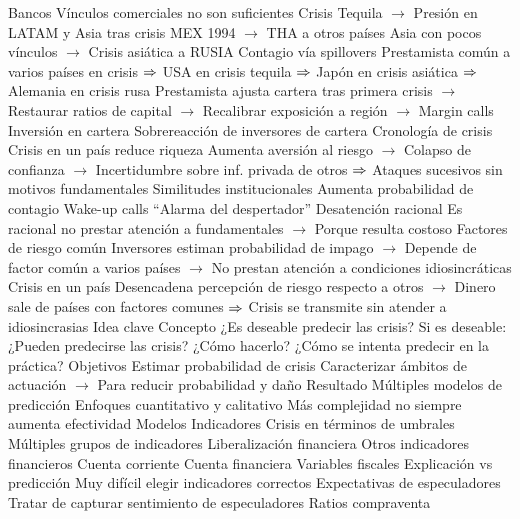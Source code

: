 \documentclass{nuevotema}
\begin{document}
\begin{esquemal}
			\3 Bancos
				\4 Vínculos comerciales no son suficientes
				\4[] Crisis Tequila
				\4[] $\to$ Presión en LATAM y Asia tras crisis MEX 1994
				\4[] $\to$ THA a otros países Asia con pocos vínculos
				\4[] $\to$ Crisis asiática a RUSIA
				\4 Contagio vía spillovers
				\4[] Prestamista común a varios países en crisis
				\4[] $\Rightarrow$ USA en crisis tequila
				\4[] $\Rightarrow$ Japón en crisis asiática
				\4[] $\Rightarrow$ Alemania en crisis rusa
				\4[] Prestamista ajusta cartera tras primera crisis
				\4[] $\to$ Restaurar ratios de capital
				\4[] $\to$ Recalibrar exposición a región
				\4[] $\to$ Margin calls
			\3 Inversión en cartera
				\4 Sobrereacción de inversores de cartera
				\4 Cronología de crisis
				\4[]Crisis en un país reduce riqueza
				\4[] Aumenta aversión al riesgo
				\4[] $\to$ Colapso de confianza
				\4[] $\to$ Incertidumbre sobre inf. privada de otros
				\4[] $\Rightarrow$ Ataques sucesivos sin motivos fundamentales
				\4 Similitudes institucionales
				\4[] Aumenta probabilidad de contagio
			\3 Wake-up calls
				\4 ``Alarma del despertador''
				\4 Desatención racional
				\4[] Es racional no prestar atención a fundamentales
				\4[] $\to$ Porque resulta costoso
				\4 Factores de riesgo común
				\4[] Inversores estiman probabilidad de impago
				\4[] $\to$ Depende de factor común a varios países
				\4[] $\to$ No prestan atención a condiciones idiosincráticas
				\4 Crisis en un país
				\4[] Desencadena percepción de riesgo respecto a otros
				\4[] $\to$ Dinero sale de países con factores comunes
				\4[] $\Rightarrow$ Crisis se transmite sin atender a idiosincrasias
	\1 
		\2 Idea clave
			\3 Concepto
				\4 ¿Es deseable predecir las crisis?
				\4[] Si es deseable:
				\4 ¿Pueden predecirse las crisis?
				\4 ¿Cómo hacerlo?
				\4 ¿Cómo se intenta predecir en la práctica?
			\3 Objetivos
				\4 Estimar probabilidad de crisis
				\4 Caracterizar ámbitos de actuación
				\4[] $\to$ Para reducir probabilidad y daño
			\3 Resultado
				\4 Múltiples modelos de predicción
				\4 Enfoques cuantitativo y calitativo
				\4 Más complejidad no siempre aumenta efectividad
		\2 Modelos
			\3 Indicadores
				\4 Crisis en términos de umbrales
				\4 Múltiples grupos de indicadores
				\4[] Liberalización financiera
				\4[] Otros indicadores financieros
				\4[] Cuenta corriente
				\4[] Cuenta financiera
				\4[] Variables fiscales
				\4 Explicación vs predicción
				\4[] Muy difícil elegir indicadores correctos
			\3 Expectativas de especuladores
				\4 Tratar de capturar sentimiento de especuladores
				\4[] Ratios compraventa

\end{esquemal}
\end{document}
